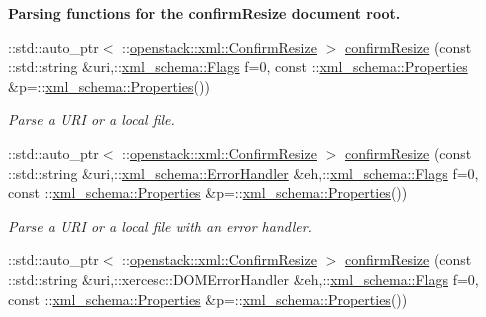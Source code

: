 \begin{Indent}{\bf Parsing functions for the confirmResize document root.}\par
\begin{DoxyCompactItemize}
\item 
::std::auto\_\-ptr$<$ ::\hyperlink{classopenstack_1_1xml_1_1ConfirmResize}{openstack::xml::ConfirmResize} $>$ \hyperlink{namespaceopenstack_1_1xml_ad9ee4469f8ed2d74fb3c61650ef538a5}{confirmResize} (const ::std::string \&uri,::\hyperlink{namespacexml__schema_affb4c227cbd9aa7453dd1dc5a1401943}{xml\_\-schema::Flags} f=0, const ::\hyperlink{namespacexml__schema_ad27ce19a7ee1d3b1064092648898f64c}{xml\_\-schema::Properties} \&p=::\hyperlink{namespacexml__schema_ad27ce19a7ee1d3b1064092648898f64c}{xml\_\-schema::Properties}())
\begin{DoxyCompactList}\small\item\em Parse a URI or a local file. \item\end{DoxyCompactList}\item 
::std::auto\_\-ptr$<$ ::\hyperlink{classopenstack_1_1xml_1_1ConfirmResize}{openstack::xml::ConfirmResize} $>$ \hyperlink{namespaceopenstack_1_1xml_abcda4484685023f980a5aa9979bc2570}{confirmResize} (const ::std::string \&uri,::\hyperlink{namespacexml__schema_ab1c9361bfd3b404eaabf0c31eded79dc}{xml\_\-schema::ErrorHandler} \&eh,::\hyperlink{namespacexml__schema_affb4c227cbd9aa7453dd1dc5a1401943}{xml\_\-schema::Flags} f=0, const ::\hyperlink{namespacexml__schema_ad27ce19a7ee1d3b1064092648898f64c}{xml\_\-schema::Properties} \&p=::\hyperlink{namespacexml__schema_ad27ce19a7ee1d3b1064092648898f64c}{xml\_\-schema::Properties}())
\begin{DoxyCompactList}\small\item\em Parse a URI or a local file with an error handler. \item\end{DoxyCompactList}\item 
::std::auto\_\-ptr$<$ ::\hyperlink{classopenstack_1_1xml_1_1ConfirmResize}{openstack::xml::ConfirmResize} $>$ \hyperlink{namespaceopenstack_1_1xml_a4fcd28a0f77c8f7aa3acb44836585324}{confirmResize} (const ::std::string \&uri,::xercesc::DOMErrorHandler \&eh,::\hyperlink{namespacexml__schema_affb4c227cbd9aa7453dd1dc5a1401943}{xml\_\-schema::Flags} f=0, const ::\hyperlink{namespacexml__schema_ad27ce19a7ee1d3b1064092648898f64c}{xml\_\-schema::Properties} \&p=::\hyperlink{namespacexml__schema_ad27ce19a7ee1d3b1064092648898f64c}{xml\_\-schema::Properties}())

\end{DoxyCompactItemize}
\end{Indent}
